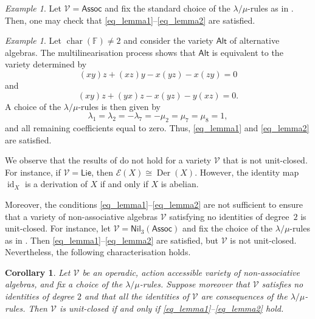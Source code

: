 \documentclass[reqno,a4paper]{amsart}
\theoremstyle{plain}
\newtheorem{corollary}[subsection]{Corollary}
\theoremstyle{definition}
\theoremstyle{remark}
\newtheorem{example}[subsection]{Example}
\numberwithin{equation}{section}
\newcommand{\F}{\mathbb{F}}
\newcommand{\E}{\mathcal{E}}
\newcommand{\V}{\mathcal{V}}
\DeclareMathOperator{\bchar}{char}
\DeclareMathOperator{\Der}{Der}
\DeclareMathOperator{\id}{id}
\newcommand{\Assoc}{\ensuremath{\mathsf{Assoc}}}
\newcommand{\Lie}{\ensuremath{\mathsf{Lie}}}
\newcommand{\Nil}{\ensuremath{\mathsf{Nil}}}
\newcommand{\Alt}{\ensuremath{\mathsf{Alt}}}
\begin{document}
\begin{example}
Let $\V=\Assoc$ and fix the standard choice of the $\lambda/\mu$-rules as in . Then, one may check that \eqref{eq_lemma1}--\eqref{eq_lemma2} are satisfied.
\end{example}

\begin{example}\label{example Alt}
Let $\bchar(\F) \neq 2$ and consider the variety $\Alt$ of alternative algebras. The multilinearisation process shows that $\Alt$ is equivalent to the variety determined by
\[
(xy)z+(xz)y-x(yz)-x(zy)=0
\]
and
\[
(xy)z+(yx)z-x(yz)-y(xz)=0.
\] 
A choice of the $\lambda/\mu$-rules is then given by
\[
\lambda_1=\lambda_2=-\lambda_7=-\mu_2=\mu_7=\mu_8=1,
\]
and all remaining coefficients equal to zero. Thus, \eqref{eq_lemma1} and \eqref{eq_lemma2} are satisfied.
\end{example}

We observe that the results of  do not hold for a variety $\V$ that is not unit-closed. For instance, if $\V = \Lie$, then $\E(X) \cong \Der(X)$. However, the identity map $\id_X$ is a derivation of $X$ if and only if $X$ is abelian. 

Moreover, the conditions \eqref{eq_lemma1}--\eqref{eq_lemma2} are not sufficient to ensure that a variety of non-associative algebras $\V$ satisfying no identities of degree~$2$ is unit-closed. For instance, let $\V = \Nil_3(\Assoc)$ and fix the choice of the $\lambda/\mu$-rules as in . Then \eqref{eq_lemma1}--\eqref{eq_lemma2} are satisfied, but $\V$ is not unit-closed. Nevertheless, the following characterisation holds.

\begin{corollary}
Let $\V$ be an operadic, action accessible variety of non-associative algebras, and fix a choice of the $\lambda/\mu$-rules. Suppose moreover that $\V$ satisfies no identities of degree $2$ and that all the identities of $\V$ are consequences of the $\lambda/\mu$-rules. Then $\V$ is unit-closed if and only if \eqref{eq_lemma1}--\eqref{eq_lemma2} hold.
\end{corollary}
\end{document}
